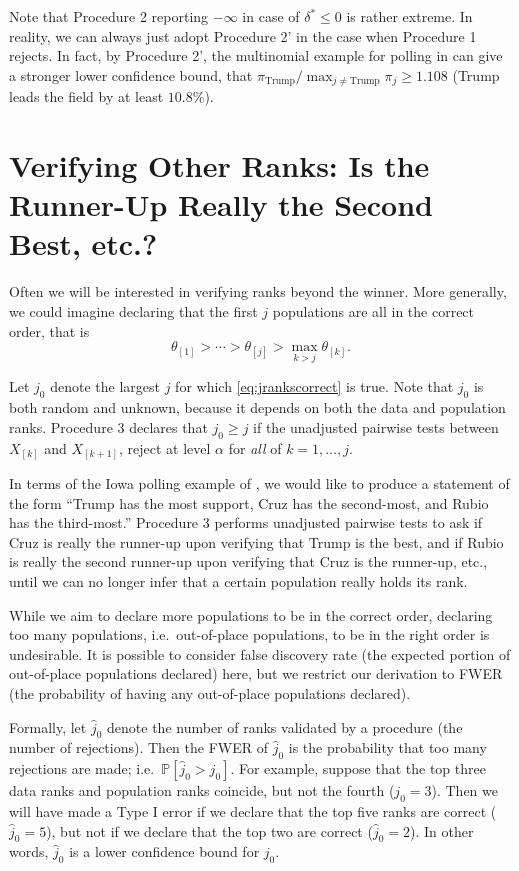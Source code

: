 \documentclass[aos, authoryear]{imsart}
\theoremstyle{definition}
\theoremstyle{custom}
\newcommand{\PP}{\mathbb{P}}
\begin{document}
Note that Procedure 2 reporting $-\infty$ in case of $\delta^* \le 0$ is rather extreme. In reality, we can always just adopt Procedure 2' in the case when Procedure 1 rejects. In fact, by Procedure 2', the multinomial example for polling in  can give a stronger lower confidence bound, that $\pi_{\text{Trump}} / \max_{j \ne \text{Trump}} \pi_{j} \ge 1.108$ (Trump leads the field by at least $10.8\%$).

\section{Verifying Other Ranks: Is the Runner-Up Really the Second Best, etc.?}
\label{sec:stepwise}

Often we will be interested in verifying ranks beyond the winner. More generally, we could imagine declaring that the first $j$ populations are all in the correct order, that is
\begin{equation}
\label{eq:jrankscorrect}
\theta_{[1]} > \cdots > \theta_{[j]} > \max_{k>j} \theta_{[k]}.
\end{equation}

Let $j_0$ denote the largest $j$ for which \eqref{eq:jrankscorrect} is true. Note that $j_0$ is both random and unknown, because it depends on both the data and population ranks. Procedure 3 declares that $j_0 \ge j$ if the unadjusted pairwise tests between $X_{[k]}$ and $X_{[k+1]}$, reject at level $\alpha$ for {\em all} of $k = 1, \ldots, j$.

In terms of the Iowa polling example of , we would like to produce a statement of the form ``Trump has the most support, Cruz has the second-most, and Rubio has the third-most.'' Procedure 3 performs unadjusted pairwise tests to ask if Cruz is really the runner-up upon verifying that Trump is the best, and if Rubio is really the second runner-up upon verifying that Cruz is the runner-up, etc., until we can no longer infer that a certain population really holds its rank.

While we aim to declare more populations to be in the correct order, declaring too many populations, i.e.\ out-of-place populations, to be in the right order is undesirable. It is possible to consider false discovery rate (the expected portion of out-of-place populations declared) here, but we restrict our derivation to FWER (the probability of having any out-of-place populations declared).

Formally, let $\hat{j}_0$ denote the number of ranks validated by a procedure (the number of rejections). Then the FWER of $\hat{j}_0$ is the probability that too many rejections are made; i.e.\ $\PP\left[\hat{j}_0 > j_0\right]$. For example, suppose that the top three data ranks and population ranks coincide, but not the fourth ($j_0 = 3$). Then we will have made a Type I error if we declare that the top five ranks are correct ($\hat{j}_0 = 5$), but not if we declare that the top two are correct ($\hat{j}_0 = 2$). In other words, $\hat{j}_0$ is a lower confidence bound for $j_0$.
\end{document}
